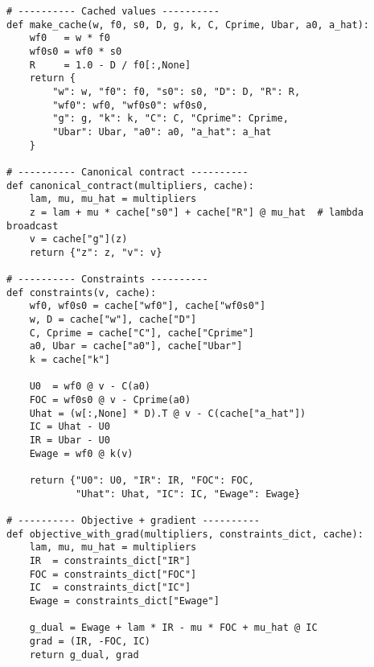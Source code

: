 \documentclass[11pt]{article}
\begin{document}
\begin{verbatim}
# ---------- Cached values ----------
def make_cache(w, f0, s0, D, g, k, C, Cprime, Ubar, a0, a_hat):
    wf0   = w * f0
    wf0s0 = wf0 * s0
    R     = 1.0 - D / f0[:,None]
    return {
        "w": w, "f0": f0, "s0": s0, "D": D, "R": R,
        "wf0": wf0, "wf0s0": wf0s0,
        "g": g, "k": k, "C": C, "Cprime": Cprime,
        "Ubar": Ubar, "a0": a0, "a_hat": a_hat
    }

# ---------- Canonical contract ----------
def canonical_contract(multipliers, cache):
    lam, mu, mu_hat = multipliers
    z = lam + mu * cache["s0"] + cache["R"] @ mu_hat  # lambda broadcast
    v = cache["g"](z)
    return {"z": z, "v": v}

# ---------- Constraints ----------
def constraints(v, cache):
    wf0, wf0s0 = cache["wf0"], cache["wf0s0"]
    w, D = cache["w"], cache["D"]
    C, Cprime = cache["C"], cache["Cprime"]
    a0, Ubar = cache["a0"], cache["Ubar"]
    k = cache["k"]

    U0  = wf0 @ v - C(a0)
    FOC = wf0s0 @ v - Cprime(a0)
    Uhat = (w[:,None] * D).T @ v - C(cache["a_hat"])
    IC = Uhat - U0
    IR = Ubar - U0
    Ewage = wf0 @ k(v)

    return {"U0": U0, "IR": IR, "FOC": FOC,
            "Uhat": Uhat, "IC": IC, "Ewage": Ewage}

# ---------- Objective + gradient ----------
def objective_with_grad(multipliers, constraints_dict, cache):
    lam, mu, mu_hat = multipliers
    IR  = constraints_dict["IR"]
    FOC = constraints_dict["FOC"]
    IC  = constraints_dict["IC"]
    Ewage = constraints_dict["Ewage"]

    g_dual = Ewage + lam * IR - mu * FOC + mu_hat @ IC
    grad = (IR, -FOC, IC)
    return g_dual, grad
\end{verbatim}
\end{document}
